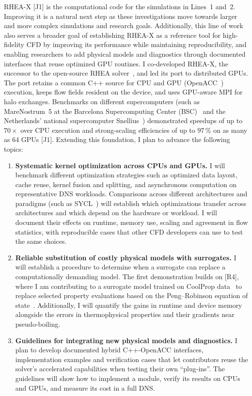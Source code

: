 \documentclass[11pt]{article}
\begin{document}
RHEA-X [J1] is the computational code for the simulations in Lines~1 and~2. 
Improving it is a natural next step as these investigations move towards larger and more complex simulations and research goals. 
Additionally, this line of work also serves a broader goal of establishing RHEA-X as a reference tool for high-fidelity CFD by improving its performance while maintaining reproducibility, and enabling researchers to add physical models and diagnostics through documented interfaces that reuse optimized GPU routines.
I co-developed RHEA-X, the successor to the open-source RHEA solver~\cite{RHEASoftware}, and led its port to distributed GPUs. 
The port retains a common C++ source for CPU and GPU (OpenACC~\cite{OpenACC}) execution, keeps flow fields resident on the device, and uses GPU-aware MPI for halo exchanges. 
Benchmarks on different supercomputers (such as MareNostrum~5 at the Barcelona Supercomputing Center (BSC)~\cite{BSC} and the Netherlands' national supercomputer Snellius~\cite{Snellius}) demonstrated speedups of up to $70\times$ over CPU execution and strong-scaling efficiencies of up to $97\,\%$ on as many as 64 GPUs [J1]. 
Extending this foundation, I plan to advance the following topics:
\begin{enumerate}
	\item \textbf{Systematic kernel optimization across CPUs and GPUs.}
	I will benchmark different optimization strategies such as optimized data layout, cache reuse, kernel fusion and splitting, and asynchronous computation on representative DNS workloads. 
	Comparisons across different architectures and paradigms (such as SYCL~\cite{SYCL}) will establish which optimizations transfer across architectures and which depend on the hardware or workload. 
	I will document their effects on runtime, memory use, scaling and agreement in flow statistics, with reproducible cases that other CFD developers can use to test the same choices.
	
	\item \textbf{Reliable substitution of costly physical models with surrogates.}
	I will establish a procedure to determine when a surrogate can replace a computationally demanding model. 
	The first demonstration builds on [R4], where I am contributing to a surrogate model trained on CoolProp data~\cite{CoolProp2014} to replace selected property evaluations based on the Peng--Robinson equation of state~\cite{PengRobinson1976}. 
	Additionally, I will quantify the gains in runtime and device memory alongside the errors in thermophysical properties and their gradients near pseudo-boiling.
	
	\item \textbf{Guidelines for integrating new physical models and diagnostics.}
	I plan to develop documented hybrid C++-OpenACC interfaces, implementation examples and verification cases that let contributors reuse the solver's accelerated capabilities when testing their own ``plug-ins''. 
	The guidelines will show how to implement a module, verify its results on CPUs and GPUs, and measure its cost in a full DNS. 
\end{enumerate}
\end{document}
